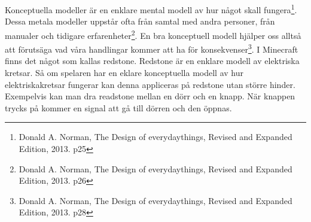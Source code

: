 Konceptuella modeller är en enklare mental modell av hur något skall fungera\footnote{Donald A. Norman, The Design of everydaythings, Revised and Expanded Edition, 2013. p25}.
Dessa metala modeller uppstår ofta från samtal med andra personer, från manualer och tidigare erfarenheter\footnote{Donald A. Norman, The Design of everydaythings, Revised and Expanded Edition, 2013. p26}.
En bra konceptuell modell hjälper oss alltså att förutsäga vad våra handlingar kommer att ha för konsekvenser\footnote{Donald A. Norman, The Design of everydaythings, Revised and Expanded Edition, 2013. p28}.
I Minecraft finns det något som kallas redstone. Redstone är en enklare modell av elektriska kretsar. Så om spelaren
har en eklare konceptuella modell av hur elektriskakretsar fungerar kan denna appliceras på redstone utan större hinder. Exempelvis kan man
dra readstone mellan en dörr och en knapp. När knappen trycks på kommer en signal att gå till dörren och den öppnas. 